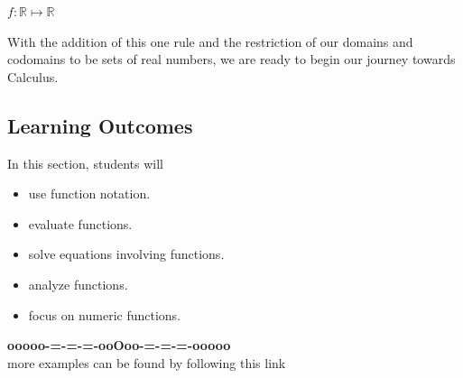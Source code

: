 \documentclass{ximera}
\begin{document}
\begin{center}
\textbf{\textcolor{blue!55!black}{$f : \mathbb{R} \mapsto \mathbb{R}$}} 
\end{center}





With the addition of this one rule and the restriction of our domains and codomains to be sets of real numbers, we are ready to begin our journey towards Calculus.








\subsection*{Learning Outcomes}


\begin{sectionOutcomes}
In this section, students will 

\begin{itemize}
\item use function notation.
\item evaluate functions.
\item solve equations involving functions.
\item analyze functions.
\item focus on numeric functions.
\end{itemize}
\end{sectionOutcomes}






\begin{onlineOnly}
\begin{center}
\textbf{\textcolor{green!50!black}{ooooo-=-=-=-ooOoo-=-=-=-ooooo}} \\

more examples can be found by following this link\\ 

\end{center}
\end{onlineOnly}
\end{document}
